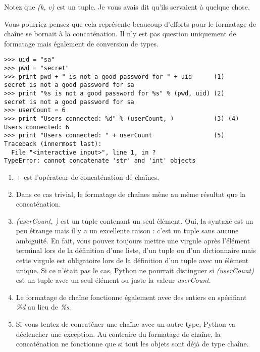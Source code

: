 Notez que \emph{(k, v)} est un tuple. Je vous avais dit qu'ils servaient à quelque chose.

Vous pourriez pensez que cela représente beaucoup d'efforts pour le formatage de chaîne se bornait à la concaténation. Il n'y est pas question uniquement de formatage mais également de conversion de types.

\begin{example}
\begin{lstlisting}
>>> uid = "sa"
>>> pwd = "secret"
>>> print pwd + " is not a good password for " + uid      (1)
secret is not a good password for sa
>>> print "%s is not a good password for %s" % (pwd, uid) (2)
secret is not a good password for sa
>>> userCount = 6
>>> print "Users connected: %d" % (userCount, )           (3) (4)
Users connected: 6
>>> print "Users connected: " + userCount                 (5)
Traceback (innermost last):
  File "<interactive input>", line 1, in ?
TypeError: cannot concatenate 'str' and 'int' objects
\end{lstlisting}
\end{example}

\begin{enumerate}
\item + est l'opérateur de concaténation de chaînes.
\item Dans ce cas trivial, le formatage de chaînes mène au même résultat que la
    concaténation.
\item \emph{(userCount, )} est un tuple contenant un seul élément. Oui, la syntaxe est
    un peu étrange mais il y a un excellente raison : c'est un tuple sans aucune
    ambiguité. En fait, vous pouvez toujours mettre une virgule après
    l'élément terminal lors de la définition d'une liste, d'un tuple ou d'un
    dictionnaire mais cette virgule est obligatoire lors de la définition d'un
    tuple avec un élément unique. Si ce n'était pas le cas, Python ne pourrait
    distinguer si \emph{(userCount)} est un tuple avec un seul élément ou juste la
    valeur \emph{userCount}.
\item Le formatage de chaîne fonctionne également avec des entiers en spécifiant
    \emph{\%d} au lieu de \emph{\%s}.
\item Si vous tentez de concaténer une chaîne avec un autre type, Python va
    déclencher une exception. Au contraire du formatage de chaîne, la
    concaténation ne fonctionne que si tout les objets sont déjà de type
    chaîne.
\end{enumerate}

